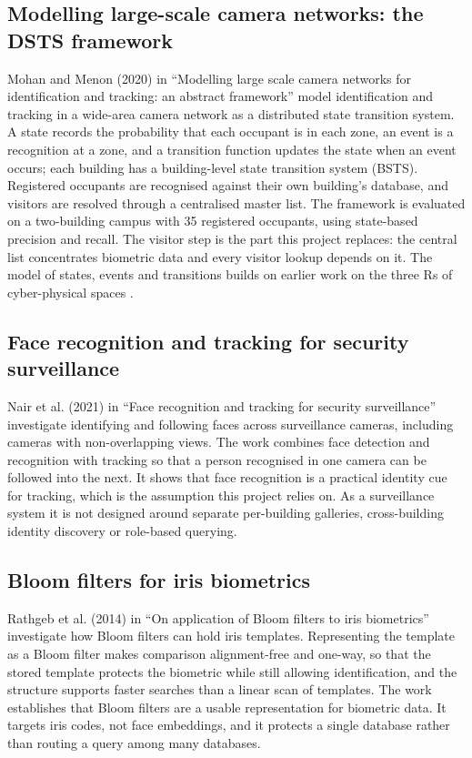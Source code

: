 \documentclass[12pt,a4paper,oneside]{report}
\begin{document}
\subsection{Modelling large-scale camera networks: the DSTS framework}
Mohan and Menon (2020) in ``Modelling large scale camera networks for identification and tracking: an abstract framework'' \cite{ref6} model identification and tracking in a wide-area camera network as a distributed state transition system. A state records the probability that each occupant is in each zone, an event is a recognition at a zone, and a transition function updates the state when an event occurs; each building has a building-level state transition system (BSTS). Registered occupants are recognised against their own building's database, and visitors are resolved through a centralised master list. The framework is evaluated on a two-building campus with 35 registered occupants, using state-based precision and recall. The visitor step is the part this project replaces: the central list concentrates biometric data and every visitor lookup depends on it. The model of states, events and transitions builds on earlier work on the three Rs of cyber-physical spaces \cite{ref7}.

\clearpage
\subsection{Face recognition and tracking for security surveillance}
Nair et al. (2021) in ``Face recognition and tracking for security surveillance'' \cite{ref8} investigate identifying and following faces across surveillance cameras, including cameras with non-overlapping views. The work combines face detection and recognition with tracking so that a person recognised in one camera can be followed into the next. It shows that face recognition is a practical identity cue for tracking, which is the assumption this project relies on. As a surveillance system it is not designed around separate per-building galleries, cross-building identity discovery or role-based querying.

\subsection{Bloom filters for iris biometrics}
Rathgeb et al. (2014) in ``On application of Bloom filters to iris biometrics'' \cite{ref10} investigate how Bloom filters can hold iris templates. Representing the template as a Bloom filter makes comparison alignment-free and one-way, so that the stored template protects the biometric while still allowing identification, and the structure supports faster searches than a linear scan of templates. The work establishes that Bloom filters are a usable representation for biometric data. It targets iris codes, not face embeddings, and it protects a single database rather than routing a query among many databases.
\end{document}
